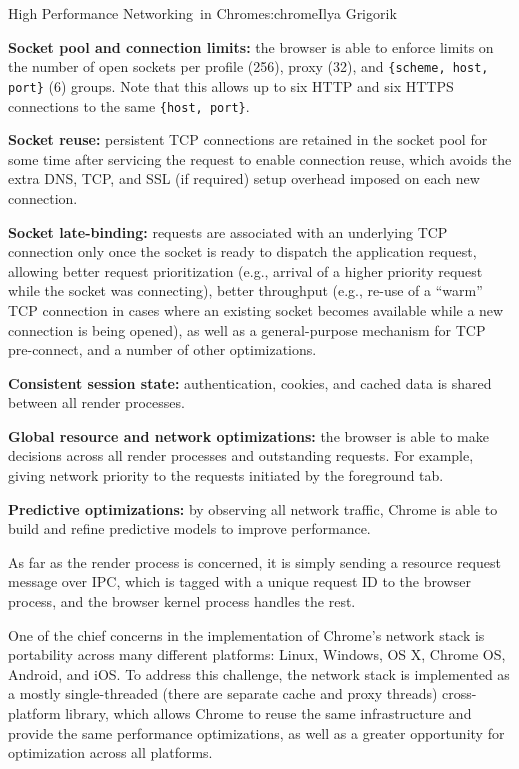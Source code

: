 \begin{aosachapter}{High Performance Networking~in Chrome}{s:chrome}{Ilya Grigorik}
\begin{aosaitemize}
\item
  \textbf{Socket pool and connection limits:} the browser is able to
  enforce limits on the number of open sockets per profile (256), proxy
  (32), and \texttt{\{scheme, host, port\}} (6) groups. Note that this
  allows up to six HTTP and six HTTPS connections to the same
  \texttt{\{host, port\}}.
\item
  \textbf{Socket reuse:} persistent TCP connections are retained in the
  socket pool for some time after servicing the request to enable
  connection reuse, which avoids the extra DNS, TCP, and SSL (if
  required) setup overhead imposed on each new connection.
\item
  \textbf{Socket late-binding:} requests are associated with an
  underlying TCP connection only once the socket is ready to dispatch
  the application request, allowing better request prioritization (e.g.,
  arrival of a higher priority request while the socket was connecting),
  better throughput (e.g., re-use of a ``warm'' TCP connection in cases
  where an existing socket becomes available while a new connection is
  being opened), as well as a general-purpose mechanism for TCP
  pre-connect, and a number of other optimizations.
\item
  \textbf{Consistent session state:} authentication, cookies, and cached
  data is shared between all render processes.
\item
  \textbf{Global resource and network optimizations:} the browser is
  able to make decisions across all render processes and outstanding
  requests. For example, giving network priority to the requests
  initiated by the foreground tab.
\item
  \textbf{Predictive optimizations:} by observing all network traffic,
  Chrome is able to build and refine predictive models to improve
  performance.
\end{aosaitemize}

As far as the render process is concerned, it is simply sending a
resource request message over IPC, which is tagged with a unique request
ID to the browser process, and the browser kernel process handles the
rest.


One of the chief concerns in the implementation of Chrome's network
stack is portability across many different platforms: Linux, Windows, OS
X, Chrome OS, Android, and iOS. To address this challenge, the network
stack is implemented as a mostly single-threaded (there are separate
cache and proxy threads) cross-platform library, which allows Chrome to
reuse the same infrastructure and provide the same performance
optimizations, as well as a greater opportunity for optimization across
all platforms.


\end{aosachapter}
